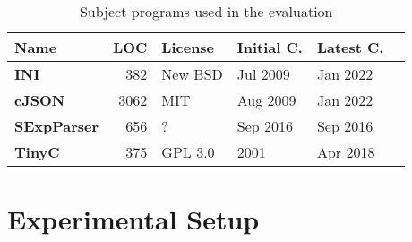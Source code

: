 \documentclass[sigconf,review,anonymous]{acmart}
\begin{document}
\begin{table}[!tbp]\centering
\caption{Subject programs used in the evaluation}
\begin{tabular}{|l | r | l | l | l | l |}
\hline
\textbf{Name} & \textbf{LOC} & \textbf{License} & \textbf{Initial C.} & \textbf{Latest C.} \\
\hline
\textbf{INI} & 382 & New BSD & Jul 2009 & Jan 2022\\
\textbf{cJSON} & 3062 & MIT & Aug 2009 & Jan 2022\\
\textbf{SExpParser} & 656 & ? & Sep 2016 & Sep 2016\\
\textbf{TinyC} & 375 & GPL 3.0 & 2001 & Apr 2018\\
\hline
\end{tabular}
\label{tab:subject-programs}
\end{table}

\section{Experimental Setup}
\label{sec:experimental-setup}
\end{document}
